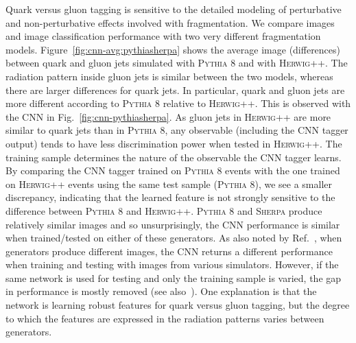 Quark versus gluon tagging is sensitive to the detailed modeling of perturbative and non-perturbative effects involved with fragmentation.  
We compare images and image classification performance with two very different fragmentation models.  
Figure~\ref{fig:cnn-avg:pythiasherpa} shows the average image (differences) between quark and gluon jets simulated with 
\textsc{Pythia} 8 and with \textsc{Herwig++}.  
The radiation pattern inside gluon jets is similar between the two models, whereas there are larger differences for quark jets.  
In particular, quark and gluon jets are more different according to \textsc{Pythia} 8 relative to \textsc{Herwig++}.  
This is observed with the CNN in Fig.~\ref{fig:cnn-pythiasherpa}.  
As gluon jets in \textsc{Herwig++} are more similar to quark jets than in \textsc{Pythia} 8, 
any observable (including the CNN tagger output) tends to have less discrimination power when tested in \textsc{Herwig++}.
The training sample determines the nature of the observable the CNN tagger learns. 
By comparing the CNN tagger trained on \textsc{Pythia} 8 events with the one trained on \textsc{Herwig++} events
using the same test sample (\textsc{Pythia} 8),
we see a smaller discrepancy, indicating that the learned feature is not strongly sensitive 
to the difference between \textsc{Pythia} 8 and \textsc{Herwig++}.
\textsc{Pythia} 8 and \textsc{Sherpa} produce relatively similar images and so unsurprisingly, 
the CNN performance is similar when trained/tested on either of these generators.  
As also noted by Ref.~\cite{Barnard:2016qma}, when generators produce different images, 
the CNN returns a different performance when training and testing with images from various simulators.  
However, if the same network is used for testing and only the training sample is varied, 
the gap in performance is mostly removed (see also~\cite{Komiske:2016rsd}).  
One explanation is that the network is learning robust features for quark versus gluon tagging, 
but the degree to which the features are expressed in the radiation patterns varies between generators.

